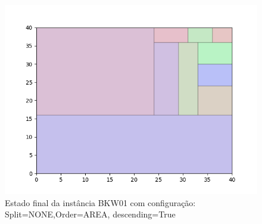 \begin{figure}[H]
    \centering
    \caption[]{Estado final da instância BKW01 com configuração: Split=NONE,Order=AREA, descending=True}
    \label{fig:bkw01-none-area-true}
    \includegraphics[scale=0.5]{output/figures/bkw/bkw01/none/area/true/00}
\end{figure}
